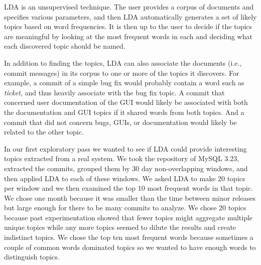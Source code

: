 \documentclass[times, 10pt,twocolumn]{article}
\newcommand{\shrinkit}{\vspace*{-.3em}}
\begin{document}
LDA is an unsupervised technique.  The user provides a corpus of
documents and specifies various parameters, and then LDA automatically
generates a set of likely topics based on word frequencies.  It is
then up to the user to decide if the topics are meaningful by looking
at the most frequent words in each and deciding what each discovered
topic should be named.

In addition to finding the topics, LDA can also associate the
documents (i.e., commit messages) in its corpus to one or more of the
topics it discovers.  For example, a commit of a simple bug fix would
probably contain a word such as \emph{ticket}, and thus heavily associate
with the bug fix topic.  A commit that concerned user documentation of
the GUI would likely be associated with both the documentation and GUI
topics if it shared words from both topics.  And a commit that did not
concern bugs, GUIs, or documentation would likely be related to the other topic.









\shrinkit
{}
\shrinkit

In our first exploratory pass we wanted to see if LDA could provide
interesting topics extracted from a real system. We took the
repository of MySQL 3.23, extracted the commits, grouped them by 30
day non-overlapping windows, and then applied LDA to each of these
windows. We asked LDA to make 20 topics per window and we then
examined the top 10 most frequent words in that topic.  We chose one
month because it was smaller than the time between minor releases but
large enough for there to be many commits to analyze. We chose 20
topics because past experimentation showed that fewer topics might
aggregate multiple unique topics while any more topics seemed to dilute
the results and create indistinct topics. 
  We chose the top ten most frequent words because sometimes a couple
  of common words dominated topics so we wanted to have enough words
  to distinguish topics.



\end{document}
